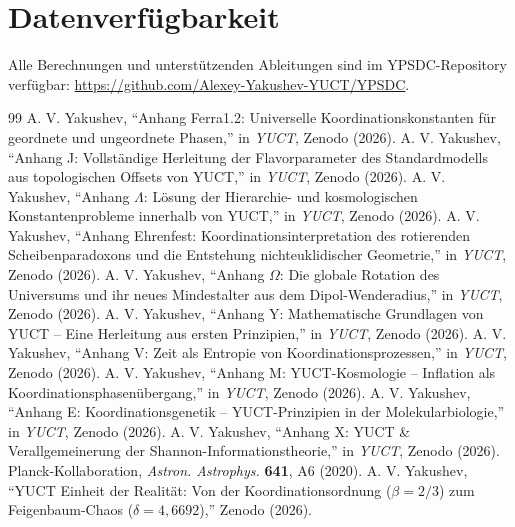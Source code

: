 \documentclass[12pt,a4paper]{article}
\begin{document}
	\section*{Datenverfügbarkeit}
	Alle Berechnungen und unterstützenden Ableitungen sind im YPSDC-Repository verfügbar: \url{https://github.com/Alexey-Yakushev-YUCT/YPSDC}.
	
	\begin{thebibliography}{99}
		 A. V. Yakushev, ``Anhang Ferra1.2: Universelle Koordinationskonstanten für geordnete und ungeordnete Phasen,'' in \emph{YUCT}, Zenodo (2026).
		 A. V. Yakushev, ``Anhang J: Vollständige Herleitung der Flavorparameter des Standardmodells aus topologischen Offsets von YUCT,'' in \emph{YUCT}, Zenodo (2026).
		 A. V. Yakushev, ``Anhang \(\Lambda\): Lösung der Hierarchie- und kosmologischen Konstantenprobleme innerhalb von YUCT,'' in \emph{YUCT}, Zenodo (2026).
		 A. V. Yakushev, ``Anhang Ehrenfest: Koordinationsinterpretation des rotierenden Scheibenparadoxons und die Entstehung nichteuklidischer Geometrie,'' in \emph{YUCT}, Zenodo (2026).
		 A. V. Yakushev, ``Anhang \(\Omega\): Die globale Rotation des Universums und ihr neues Mindestalter aus dem Dipol-Wenderadius,'' in \emph{YUCT}, Zenodo (2026).
		 A. V. Yakushev, ``Anhang Y: Mathematische Grundlagen von YUCT – Eine Herleitung aus ersten Prinzipien,'' in \emph{YUCT}, Zenodo (2026).
		 A. V. Yakushev, ``Anhang V: Zeit als Entropie von Koordinationsprozessen,'' in \emph{YUCT}, Zenodo (2026).
		 A. V. Yakushev, ``Anhang M: YUCT-Kosmologie – Inflation als Koordinationsphasenübergang,'' in \emph{YUCT}, Zenodo (2026).
		 A. V. Yakushev, ``Anhang E: Koordinationsgenetik – YUCT-Prinzipien in der Molekularbiologie,'' in \emph{YUCT}, Zenodo (2026).
		 A. V. Yakushev, ``Anhang X: YUCT \& Verallgemeinerung der Shannon-Informationstheorie,'' in \emph{YUCT}, Zenodo (2026).
		 Planck-Kollaboration, \emph{Astron. Astrophys.} \textbf{641}, A6 (2020).
		 A. V. Yakushev, ``YUCT Einheit der Realität: Von der Koordinationsordnung (\(\beta = 2/3\)) zum Feigenbaum-Chaos (\(\delta = 4,6692\)),'' Zenodo (2026).
	\end{thebibliography}
	
\end{document}

